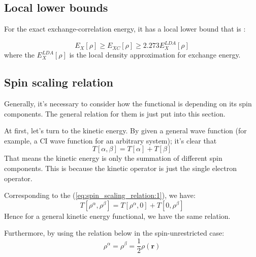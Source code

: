  




\subsection{Local lower bounds}
\label{sec:local_lower_bound}

For the exact exchange-correlation energy, it has a local lower bound
that is :

\begin{equation}
  \label{local_lower_bound_equation}
 E_{X}[\rho] \geq E_{XC}[\rho] \geq 2.273  E_{X}^{LDA}[\rho]
\end{equation}
where the $E_{X}^{LDA}[\rho]$ is the local density approximation for
exchange energy.



\subsection{Spin scaling relation}
\label{sec:spin_scaling_relation}

Generally, it's necessary to consider how the functional is depending
on its spin components. The general relation for them is just put into
this section. 

At first, let's turn to the kinetic energy. By given a general wave
function (for example, a CI wave function for an arbitrary system);
it's clear that 
\begin{equation}
\label{eq:spin_scaling_relation:1}
T[\alpha, \beta] = T[\alpha] + T[\beta]
\end{equation}
That means the kinetic energy is only the summation of different spin
components. This is because the kinetic operator is just the single
electron operator.

Corresponding to the (\ref{eq:spin_scaling_relation:1}), we have:
\begin{equation}
\label{eq:spin_scaling_relation:2}
T[\rho^{\alpha}, \rho^{\beta}] = T[\rho^{\alpha}, 0] + T[0,
\rho^{\beta}]
\end{equation}
Hence for a general kinetic energy functional, we have the same relation.

Furthermore, by using the relation below in the spin-unrestricted case:
\begin{equation}\label{}
\rho^{\alpha} = \rho^{\beta} = \frac{1}{2}\rho(\bm{r})
\end{equation}

